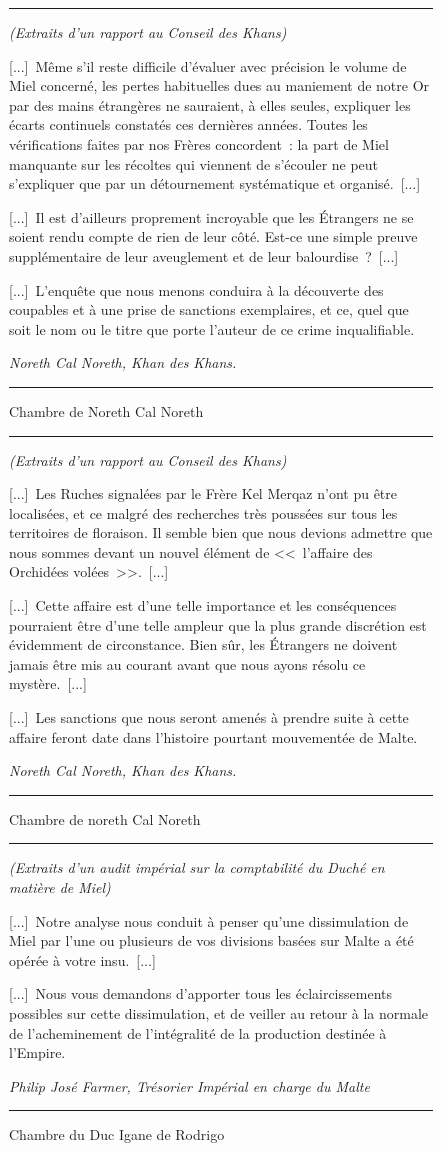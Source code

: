 \documentclass{article}
\newcommand{\newcharacter}{\clearpage\setcounter{figure}{0}}
\newcommand{\indice}[4]{
  \begin{figure}[H]
    \begin{center}
      \rule{0.5\textwidth}{1pt}
    \end{center}
    \begin{framed}
      \begin{samepage}
        \textit{#1}
        \nopagebreak

        #2

        \nopagebreak

        \hfill\textit{#3}
      \end{samepage}
    \end{framed}
    \caption{#4}
    \begin{center}
      \rule{0.5\textwidth}{1pt}
    \end{center}
  \end{figure}
}
\begin{document}
\indice
{(Extraits d'un rapport au Conseil des Khans)}
{[...]~Même s'il reste difficile d'évaluer avec précision le volume de Miel
concerné, les pertes habituelles dues au maniement de notre Or par des mains
étrangères ne sauraient, à elles seules, expliquer les écarts continuels
constatés ces dernières années. Toutes les vérifications faites par nos Frères
concordent~: la part de Miel manquante sur les récoltes qui viennent de
s'écouler ne peut s'expliquer que par un détournement systématique et
organisé.~[...]

\nobreak

[...]~Il est d'ailleurs proprement incroyable que les Étrangers ne se soient
rendu compte de rien de leur côté. Est-ce une simple preuve supplémentaire de
leur aveuglement et de leur balourdise~?~[...]

\nobreak

[...]~L'enquête que nous menons conduira à la découverte des coupables et à une
prise de sanctions exemplaires, et ce, quel que soit le nom ou le titre que
porte l'auteur de ce crime inqualifiable.}
{Noreth Cal Noreth, Khan des Khans.}
{Chambre de Noreth Cal Noreth}

\indice
{(Extraits d'un rapport au Conseil des Khans)}
{[...]~Les Ruches signalées par le Frère Kel Merqaz n'ont pu être localisées,
et ce malgré des recherches très poussées sur tous les territoires de
floraison. Il semble bien que nous devions admettre que nous sommes devant un
nouvel élément de <<~l'affaire des Orchidées volées~>>.~[...]

\nobreak

[...]~Cette affaire est d'une telle importance et les conséquences pourraient
être d'une telle ampleur que la plus grande discrétion est évidemment de
circonstance. Bien sûr, les Étrangers ne doivent jamais être mis au courant
avant que nous ayons résolu ce mystère.~[...]

\nobreak

[...]~Les sanctions que nous seront amenés à prendre suite à cette affaire
feront date dans l'histoire pourtant mouvementée de Malte.}
{Noreth Cal Noreth, Khan des Khans.}
{Chambre de noreth Cal Noreth}

\newcharacter

\indice
{(Extraits d'un audit impérial sur la comptabilité du Duché en matière de
Miel)}
{[...]~Notre analyse nous conduit à penser qu'une dissimulation de Miel par
l'une ou plusieurs de vos divisions basées sur Malte a été opérée à votre
insu.~[...]

\nobreak

[...]~Nous vous demandons d'apporter tous les éclaircissements possibles sur
cette dissimulation, et de veiller au retour à la normale de l'acheminement de
l'intégralité de la production destinée à l'Empire.}
{Philip José Farmer, Trésorier Impérial en charge du Malte}
{Chambre du Duc Igane de Rodrigo}
\end{document}
